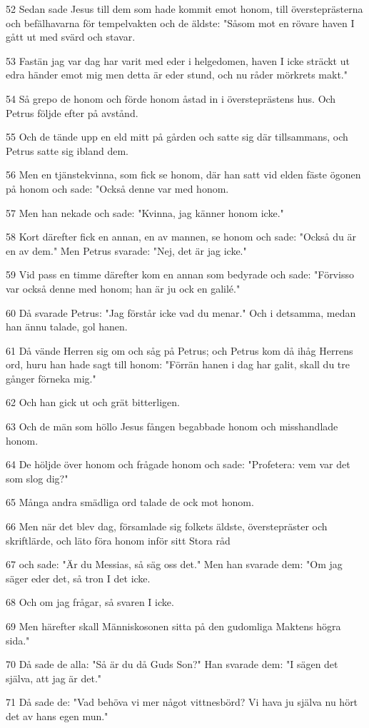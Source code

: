 \par 52 Sedan sade Jesus till dem som hade kommit emot honom, till översteprästerna och befälhavarna för tempelvakten och de äldste: "Såsom mot en rövare haven I gått ut med svärd och stavar.
\par 53 Fastän jag var dag har varit med eder i helgedomen, haven I icke sträckt ut edra händer emot mig men detta är eder stund, och nu råder mörkrets makt."
\par 54 Så grepo de honom och förde honom åstad in i översteprästens hus. Och Petrus följde efter på avstånd.
\par 55 Och de tände upp en eld mitt på gården och satte sig där tillsammans, och Petrus satte sig ibland dem.
\par 56 Men en tjänstekvinna, som fick se honom, där han satt vid elden fäste ögonen på honom och sade: "Också denne var med honom.
\par 57 Men han nekade och sade: "Kvinna, jag känner honom icke."
\par 58 Kort därefter fick en annan, en av mannen, se honom och sade: "Också du är en av dem." Men Petrus svarade: "Nej, det är jag icke."
\par 59 Vid pass en timme därefter kom en annan som bedyrade och sade: "Förvisso var också denne med honom; han är ju ock en galilé."
\par 60 Då svarade Petrus: "Jag förstår icke vad du menar." Och i detsamma, medan han ännu talade, gol hanen.
\par 61 Då vände Herren sig om och såg på Petrus; och Petrus kom då ihåg Herrens ord, huru han hade sagt till honom: "Förrän hanen i dag har galit, skall du tre gånger förneka mig."
\par 62 Och han gick ut och grät bitterligen.
\par 63 Och de män som höllo Jesus fången begabbade honom och misshandlade honom.
\par 64 De höljde över honom och frågade honom och sade: "Profetera: vem var det som slog dig?"
\par 65 Många andra smädliga ord talade de ock mot honom.
\par 66 Men när det blev dag, församlade sig folkets äldste, överstepräster och skriftlärde, och läto föra honom inför sitt Stora råd
\par 67 och sade: "Är du Messias, så säg oss det." Men han svarade dem: "Om jag säger eder det, så tron I det icke.
\par 68 Och om jag frågar, så svaren I icke.
\par 69 Men härefter skall Människosonen sitta på den gudomliga Maktens högra sida."
\par 70 Då sade de alla: "Så är du då Guds Son?" Han svarade dem: "I sägen det själva, att jag är det."
\par 71 Då sade de: "Vad behöva vi mer något vittnesbörd? Vi hava ju själva nu hört det av hans egen mun."

